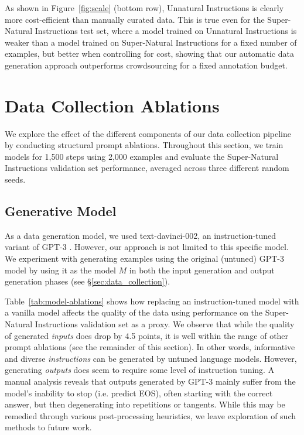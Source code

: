 As shown in Figure~\ref{fig:scale} (bottom row), Unnatural Instructions is clearly more cost-efficient than manually curated data. This is true even for the Super-Natural Instructions test set, where a model trained on Unnatural Instructions is weaker than a model trained on Super-Natural Instructions for a fixed number of examples, but better when controlling for cost, showing that our automatic data generation approach outperforms crowdsourcing for a fixed annotation budget.

\section{Data Collection Ablations}
\label{sec:ablations}

We explore the effect of the different components of our data collection pipeline by conducting structural prompt ablations. Throughout this section, we train models for 1,500 steps using 2,000 examples and evaluate the Super-Natural Instructions validation set performance, averaged across three different random seeds.

\subsection{Generative Model}
\label{sec:other_models}

As a data generation model, we used text-davinci-002, an instruction-tuned variant of GPT-3 \citep{gpt3}. However, our approach is not limited to this specific model. We experiment with generating examples using the original (untuned) GPT-3 model by using it as the model $M$ in both the input generation and output generation phases (see \S\ref{sec:data_collection}).

Table~\ref{tab:model-ablations} shows how replacing an instruction-tuned model with a vanilla model affects the quality of the data using performance on the Super-Natural Instructions validation set as a proxy. We observe that while the quality of generated \emph{inputs} does drop by 4.5 points, it is well within the range of other prompt ablations (see the remainder of this section). In other words, informative and diverse \textit{instructions} can be generated by untuned language models. However, generating \textit{outputs} does seem to require some level of instruction tuning. A manual analysis reveals that outputs generated by GPT-3 mainly suffer from the model's inability to stop (i.e. predict EOS), often starting with the correct answer, but then degenerating into repetitions or tangents. While this may be remedied through various post-processing heuristics, we leave exploration of such methods to future work.

